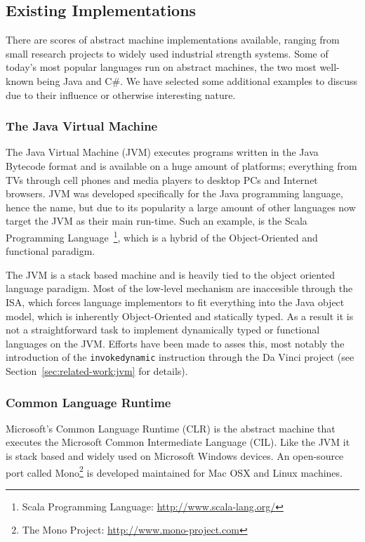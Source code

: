 \subsection{Existing Implementations}

There are scores of abstract machine implementations available, ranging from
small research projects to widely used industrial strength systems. Some of
today's most popular languages run on abstract machines, the two most well-known
being Java and C\#\cite{langpop}. We have selected some additional examples to
discuss due to their influence or otherwise interesting nature.

\subsubsection{The Java Virtual Machine}

The Java Virtual Machine (JVM) executes programs written in the Java Bytecode
format and is available on a huge amount of platforms; everything from TVs
through cell phones and media players to desktop PCs and Internet
browsers\cite{aboutjava}. JVM was developed specifically for the Java
programming language, hence the name, but due to its popularity a large amount
of other languages now target the JVM as their main run-time. Such an example,
is the Scala Programming Language~\footnote{Scala Programming Language:
  \url{http://www.scala-lang.org/}}, which is a hybrid of the Object-Oriented
and functional paradigm.

The JVM is a stack based machine and is heavily tied to the object oriented
language paradigm. Most of the low-level mechanism are inaccesible through the
ISA, which forces language implementors to fit everything into the Java object
model, which is inherently Object-Oriented and statically typed. As a result it
is not a straightforward task to implement dynamically typed or functional
languages on the JVM. Efforts have been made to asses this, most notably the
introduction of the \texttt{invokedynamic} instruction through the Da Vinci
project (see Section~\ref{sec:related-work:jvm} for details).

\subsubsection{Common Language Runtime}

Microsoft's Common Language Runtime (CLR) is the abstract machine that executes
the Microsoft Common Intermediate Language (CIL). Like the JVM it is stack based
and widely used on Microsoft Windows devices. An open-source port called
Mono\footnote{The Mono Project: \url{http://www.mono-project.com}} is developed
maintained for Mac OSX and Linux machines.

